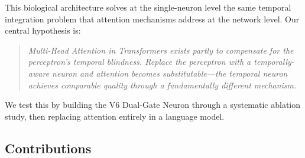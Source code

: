 \documentclass[11pt,a4paper]{article}
\begin{document}
This biological architecture solves at the single-neuron level the same
temporal integration problem that attention mechanisms address at the
network level.
Our central hypothesis is:

\begin{quote}
\emph{Multi-Head Attention in Transformers exists partly to compensate
for the perceptron's temporal blindness. Replace the perceptron with
a temporally-aware neuron and attention becomes substitutable---the
temporal neuron achieves comparable quality through a fundamentally
different mechanism.}
\end{quote}

We test this by building the V6 Dual-Gate Neuron through a systematic
ablation study, then replacing attention entirely in a language model.

\subsection{Contributions}
\end{document}
